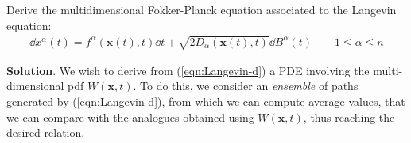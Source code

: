 \documentclass[../template.tex]{subfiles}
\begin{document}
\begin{exo}
    Derive the multidimensional Fokker-Planck equation associated to the Langevin equation:
    \begin{align} \label{eqn:Langevin-d}
        \dd{x^\alpha(t)} = f^\alpha(\bm{x}(t),t) \dd{t} + \sqrt{2 D_\alpha (\bm{x}(t),t)} \dd{B^\alpha(t)} \qquad 1 \leq \alpha \leq n
    \end{align}

    \medskip

    \textbf{Solution}. We wish to derive from (\ref{eqn:Langevin-d}) a PDE involving the multi-dimensional pdf $W(\bm{x},t)$. To do this, we consider an \textit{ensemble} of paths generated by (\ref{eqn:Langevin-d}), from which we can compute average values, that we can compare with the analogues obtained using $W(\bm{x},t)$, thus reaching the desired relation.


\end{exo}
\end{document}
